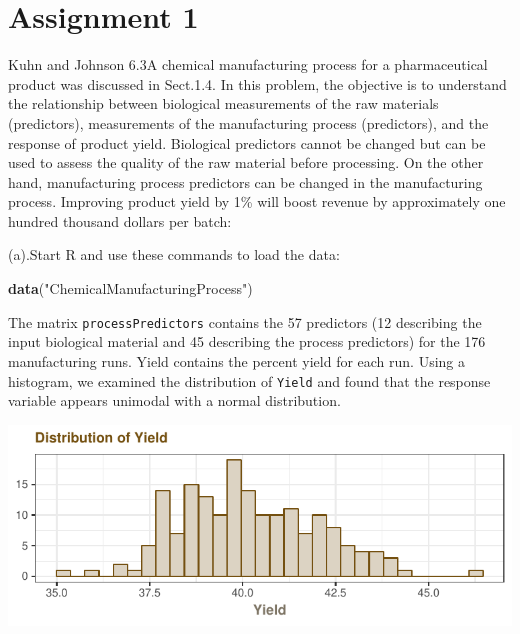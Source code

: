 \documentclass[]{report}
\newenvironment{Shaded}{\begin{snugshade}}{\end{snugshade}}
\newcommand{\KeywordTok}[1]{\textcolor[rgb]{0.13,0.29,0.53}{\textbf{#1}}}
\newcommand{\StringTok}[1]{\textcolor[rgb]{0.31,0.60,0.02}{#1}}
\newcommand{\NormalTok}[1]{#1}
\begin{document}
\newpage

\chapter*{Assignment 1}\label{AS-1}


\begin{question}{Kuhn and Johnson 6.3}A chemical manufacturing process for a pharmaceutical product was discussed in Sect.1.4. In this problem, the objective is to understand the relationship between biological measurements of the raw materials (predictors), measurements of the manufacturing process (predictors), and the response of product yield. Biological predictors cannot be changed but can be used to assess the quality of the raw material before processing. On the other hand, manufacturing process predictors can be changed in the manufacturing process. Improving product yield by 1\% will boost revenue by approximately one hundred thousand dollars per batch:\end{question}

\begin{subquestion}{(a).}Start R and use these commands to load the data:
\end{subquestion}

\begin{Shaded}
\begin{Highlighting}[]
\KeywordTok{data}\NormalTok{(}\StringTok{"ChemicalManufacturingProcess"}\NormalTok{)}
\end{Highlighting}
\end{Shaded}

The matrix \texttt{processPredictors} contains the 57 predictors (12
describing the input biological material and 45 describing the process
predictors) for the 176 manufacturing runs. Yield contains the percent
yield for each run. Using a histogram, we examined the distribution of
\texttt{Yield} and found that the response variable appears unimodal
with a normal distribution.

\begin{center}\includegraphics{Homework-Two2_files/figure-latex/kj-6.3a-plot-1} \end{center}
\end{document}
